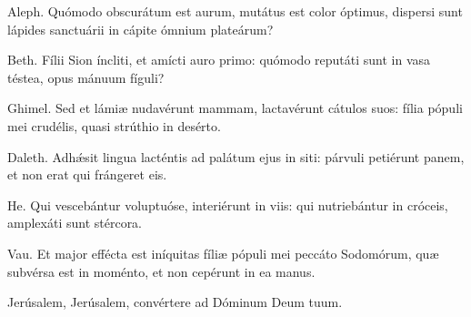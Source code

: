 
Aleph. Quómodo obscurátum est aurum, mutátus est color óptimus, dispersi sunt lápides sanctuárii in cápite ómnium plateárum?

Beth. Fílii Sion íncliti, et amícti auro primo: quómodo reputáti sunt in vasa téstea, opus mánuum fíguli?

Ghimel. Sed et lámiæ nudavérunt mammam, lactavérunt cátulos suos: fília pópuli mei crudélis, quasi strúthio in desérto.

Daleth. Adhǽsit lingua lacténtis ad palátum ejus in siti: párvuli petiérunt panem, et non erat qui frángeret eis.

He. Qui vescebántur voluptuóse, interiérunt in viis: qui nutriebántur in cróceis, amplexáti sunt stércora.

Vau. Et major effécta est iníquitas fíliæ pópuli mei peccáto Sodomórum, quæ subvérsa est in moménto, et non cepérunt in ea manus.

Jerúsalem, Jerúsalem, convértere ad Dóminum Deum tuum.
\par